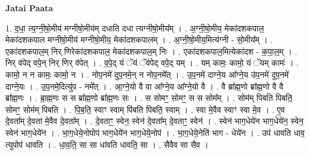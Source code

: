 \documentclass[17pt]{extarticle}
\begin{document}
\textbf{Jatai Paata} \newline

1. द॒धा॒ त्य॒ग्नी॒षो॒मीय॑ मग्नीषो॒मीय॑म् दधाति दधा त्यग्नीषो॒मीय᳚म् । . अ॒ग्नी॒षो॒मीय॒ मेका॑दशकपाल॒ मेका॑दशकपाल मग्नीषो॒मीय॑ मग्नीषो॒मीय॒ मेका॑दशकपालम् । . अ॒ग्नी॒षो॒मीय॒मित्य॑ग्नी - सो॒मीय᳚म् । . एका॑दशकपाल॒म् निर् णिरेका॑दशकपाल॒ मेका॑दशकपाल॒म् निः । . एका॑दशकपाल॒मित्येका॑दश - क॒पा॒ल॒म् । . निर् व॑पेद् वपे॒न् निर् णिर् व॑पेत् । . व॒पे॒द् यं ॅयं ॅव॑पेद् वपे॒द् यम् । . यम् कामः॒ कामो॒ यं ॅयम् कामः॑ । . कामो॒ न न कामः॒ कामो॒ न । . नोप॒नमे॑ दुप॒नमे॒न् न नोप॒नमे᳚त् । . उ॒प॒नमे॑ दाग्ने॒य आ᳚ग्ने॒य उ॑प॒नमे॑ दुप॒नमे॑ दाग्ने॒यः । . उ॒प॒नमे॒दित्यु॑प - नमे᳚त् । . आ॒ग्ने॒यो वै वा आ᳚ग्ने॒य आ᳚ग्ने॒यो वै । . वै ब्रा᳚ह्म॒णो ब्रा᳚ह्म॒णो वै वै ब्रा᳚ह्म॒णः । . ब्रा॒ह्म॒णः स स ब्रा᳚ह्म॒णो ब्रा᳚ह्म॒णः सः । . स सोमꣳ॒॒ सोमꣳ॒॒ स स सोम᳚म् । . सोम॑म् पिबति पिबति॒ सोमꣳ॒॒ सोम॑म् पिबति । . पि॒ब॒ति॒ स्वाꣳ स्वाम् पि॑बति पिबति॒ स्वाम् । . स्वा मे॒वैव स्वाꣳ स्वा मे॒व । . ए॒व दे॒वता᳚म् दे॒वता॑ मे॒वैव दे॒वता᳚म् । . दे॒वताꣳ॒॒ स्वेन॒ स्वेन॑ दे॒वता᳚म् दे॒वताꣳ॒॒ स्वेन॑ । . स्वेन॑ भाग॒धेये॑न भाग॒धेये॑न॒ स्वेन॒ स्वेन॑ भाग॒धेये॑न । . भा॒ग॒धेये॒नोपोप॑ भाग॒धेये॑न भाग॒धेये॒नोप॑ । . भा॒ग॒धेये॒नेति॑ भाग - धेये॑न । . उप॑ धावति धाव॒ त्युपोप॑ धावति । . धा॒व॒ति॒ सा सा धा॑वति धावति॒ सा । . सैवैव सा सैव । \newline
\end{document}
